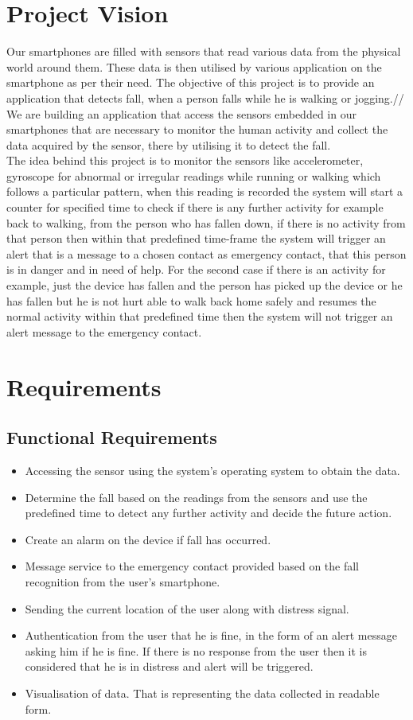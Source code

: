 \documentclass[conference]{IEEEtran}
\begin{document}
\section{Project Vision}
Our smartphones are filled with sensors that read various data from the physical world around them. These data is then utilised by various application on the smartphone as per their need. The objective of this project is to provide an application that detects fall, when a person falls while he is walking or jogging.//
We are building an application that access the sensors embedded in our smartphones that are necessary to monitor the human activity and collect the data acquired by the sensor, there by utilising it to detect the fall. \\
The idea behind this project is to monitor the sensors like accelerometer, gyroscope for abnormal or irregular readings while running or walking which follows a particular pattern, when this reading is recorded the system will start a counter for specified time to check if there is any further activity for example back to walking, from the person who has fallen down, if there is no activity from that person then within that predefined time-frame the system will trigger an alert that is a message to a chosen contact as emergency contact, that this person is in danger and in need of help. For the second case if there is an activity for example, just the device has fallen and the person has picked up the device or he has fallen but he is not hurt able to walk back home safely and resumes the normal activity within that predefined time then the system will not trigger an alert message to the emergency contact. 

\section{Requirements}
\subsection{Functional Requirements}
\begin{itemize}
\item Accessing the sensor using the system's operating system to obtain the data.
\item Determine the fall based on the readings from the sensors and use the predefined time to detect any further activity and decide the future action.
\item Create an alarm on the device if fall has occurred.
\item Message service to the emergency contact provided based on the fall recognition from the user's smartphone.
\item Sending the current location of the user along with distress signal.
\item Authentication from the user that he is fine, in the form of an alert message asking him if he is fine. If there is no response from the user then it is considered that he is in distress and alert will be triggered.
\item Visualisation of data. That is representing the data collected in readable form.
\end{itemize}
\end{document}
